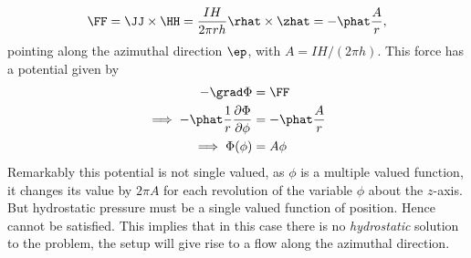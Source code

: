 \begin{equation}
\FF = \JJ \times \HH = \frac{IH}{2\pi r h}\rhat\times\zhat = -\phat \frac{A}{r},
\end{equation}
pointing along the azimuthal direction $\ep$, 
with $A= IH/(2\pi h)$. 
This force has a potential given by 
\begin{subequations}
\begin{align}
-\grad\Phi &= \FF \\
\implies   -\phat\frac{1}{r}\frac{\partial\Phi}{\partial \phi} &= 
-\phat \frac{A}{r} \\ 
\implies \Phi(\phi) &= A\phi
\end{align}
\end{subequations}
Remarkably this potential is not single valued, as
$\phi$ is a multiple valued function, it changes its value by $2\pi A$
for each revolution of the variable $\phi$ about the $z$-axis. 
But hydrostatic pressure must be a single valued function of
position. Hence  cannot be satisfied. This implies that in
this case there is no \textit{hydrostatic} solution to the problem,
the setup will give rise to a flow along the azimuthal direction. 
